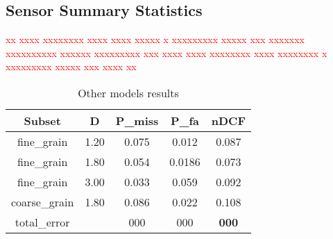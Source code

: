 \documentclass[conference]{IEEEtran}
\begin{document}
\subsection{Sensor Summary Statistics}
\textcolor{red}{xx xxxx xxxxxxxx xxxx xxxx xxxxx x xxxxxxxxx xxxxx xxx xxxxxxx xxxxxxxxxx xxxxxx xxxxxxxxx xxx xxxx xxxx xxxxxxxx xxxx xxxxxxxx x xxxxxxxxx xxxxx xxx xxxx xx\\}




\begin{table}[h!]
\begin{center}
\begin{tabular}{ c c c c c }
 Subset & D & P\_miss & P\_fa & nDCF  \\ \hline
 fine\_grain & 1.20 & 0.075 & 0.012 & 0.087 \\ 
 fine\_grain & 1.80 & 0.054 & 0.0186 & 0.073 \\  
 fine\_grain & 3.00 & 0.033 & 0.059 & 0.092 \\
 coarse\_grain & 1.80 & 0.086 & 0.022 & 0.108 \\ \hline
 total\_error & & 000 & 000 & \textbf{000}
\end{tabular} \vspace{0.25cm}
\caption{Other models results}
\label{table:other}
\end{center}
\end{table}

\end{document}
